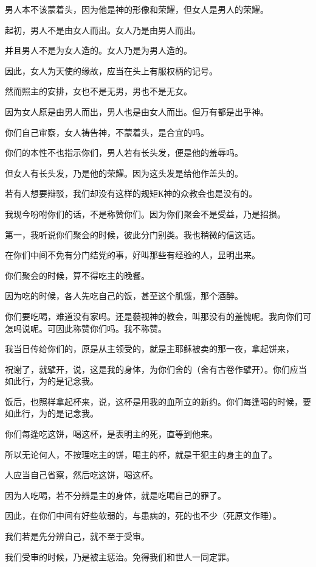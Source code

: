 \documentclass[12pt,oneside]{book}
\begin{document}
男人本不该蒙着头，因为他是神的形像和荣耀，但女人是男人的荣耀。

起初，男人不是由女人而出。女人乃是由男人而出。

并且男人不是为女人造的。女人乃是为男人造的。

因此，女人为天使的缘故，应当在头上有服权柄的记号。

然而照主的安排，女也不是无男，男也不是无女。

因为女人原是由男人而出，男人也是由女人而出。但万有都是出乎神。

你们自己审察，女人祷告神，不蒙着头，是合宜的吗。

你们的本性不也指示你们，男人若有长头发，便是他的羞辱吗。

但女人有长头发，乃是他的荣耀。因为这头发是给他作盖头的。

若有人想要辩驳，我们却没有这样的规矩К神的众教会也是没有的。

我现今吩咐你们的话，不是称赞你们。因为你们聚会不是受益，乃是招损。

第一，我听说你们聚会的时候，彼此分门别类。我也稍微的信这话。

在你们中间不免有分门结党的事，好叫那些有经验的人，显明出来。

你们聚会的时候，算不得吃主的晚餐。

因为吃的时候，各人先吃自己的饭，甚至这个肌饿，那个酒醉。

你们要吃喝，难道没有家吗。还是藐视神的教会，叫那没有的羞愧呢。我向你们可怎吗说呢。可因此称赞你们吗。我不称赞。

我当日传给你们的，原是从主领受的，就是主耶稣被卖的那一夜，拿起饼来，

祝谢了，就擘开，说，这是我的身体，为你们舍的（舍有古卷作擘开）。你们应当如此行，为的是记念我。

饭后，也照样拿起杯来，说，这杯是用我的血所立的新约。你们每逢喝的时候，要如此行，为的是记念我。

你们每逢吃这饼，喝这杯，是表明主的死，直等到他来。

所以无论何人，不按理吃主的饼，喝主的杯，就是干犯主的身主的血了。

人应当自己省察，然后吃这饼，喝这杯。

因为人吃喝，若不分辨是主的身体，就是吃喝自己的罪了。

因此，在你们中间有好些软弱的，与患病的，死的也不少（死原文作睡）。

我们若是先分辨自己，就不至于受审。

我们受审的时候，乃是被主惩治。免得我们和世人一同定罪。
\end{document}
